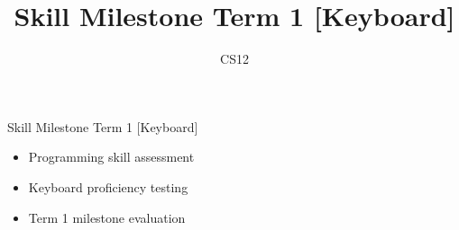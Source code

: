 \documentclass{beamer}
\title{Skill Milestone Term 1 [Keyboard]}
\author{CS12}
\date{}
\begin{document}
\begin{frame}
    \titlepage
\end{frame}

\begin{frame}{Skill Milestone Term 1 [Keyboard]}
    \begin{itemize}
        \item Programming skill assessment
        \item Keyboard proficiency testing
        \item Term 1 milestone evaluation
    \end{itemize}
\end{frame}
\end{document}
